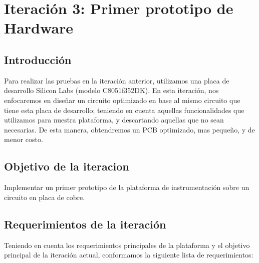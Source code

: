\chapter{Iteración 3: Primer prototipo de Hardware} %
\label{cha:iteracion_3}


\section{Introducción} %
\label{it3:sec:introduccion}

Para realizar las pruebas en la iteración anterior, utilizamos una placa de desarrollo Silicon Labs (modelo C8051f352DK). En esta iteración, nos enfocaremos en diseñar un circuito optimizado en base al mismo circuito que tiene esta placa de desarrollo; teniendo en cuenta aquellas funcionalidades que utilizamos para nuestra plataforma, y descartando aquellas que no sean necesarias. De esta manera, obtendremos un PCB optimizado, mas pequeño, y de menor costo.




\section{Objetivo de la iteracion}

Implementar un primer prototipo de la plataforma de instrumentación sobre un circuito en placa de cobre.

\section{Requerimientos de la iteración} %
\label{it3:sec:requerimientos_de_la_iteracion}

Teniendo en cuenta los requerimientos principales de la plataforma y el objetivo principal de la iteración actual, conformamos la siguiente lista de requerimientos:

